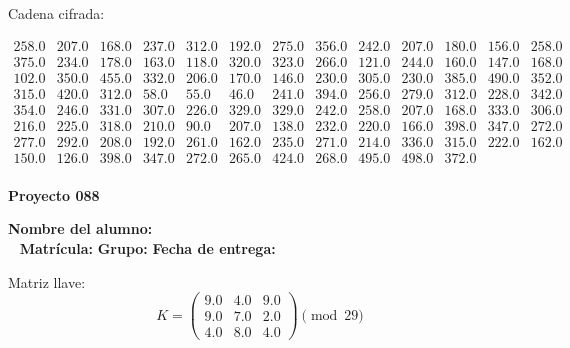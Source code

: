 \documentclass[12pt]{article}
\begin{document}
Cadena cifrada:
\begin{center}
$\begin{array}{lllllllllllll}
258.0 & 207.0 & 168.0 & 237.0 & 312.0 & 192.0 & 275.0 & 356.0 & 242.0 & 207.0 & 180.0 & 156.0 & 258.0\\
375.0 & 234.0 & 178.0 & 163.0 & 118.0 & 320.0 & 323.0 & 266.0 & 121.0 & 244.0 & 160.0 & 147.0 & 168.0\\
102.0 & 350.0 & 455.0 & 332.0 & 206.0 & 170.0 & 146.0 & 230.0 & 305.0 & 230.0 & 385.0 & 490.0 & 352.0\\
315.0 & 420.0 & 312.0 & 58.0 & 55.0 & 46.0 & 241.0 & 394.0 & 256.0 & 279.0 & 312.0 & 228.0 & 342.0\\
354.0 & 246.0 & 331.0 & 307.0 & 226.0 & 329.0 & 329.0 & 242.0 & 258.0 & 207.0 & 168.0 & 333.0 & 306.0\\
216.0 & 225.0 & 318.0 & 210.0 & 90.0 & 207.0 & 138.0 & 232.0 & 220.0 & 166.0 & 398.0 & 347.0 & 272.0\\
277.0 & 292.0 & 208.0 & 192.0 & 261.0 & 162.0 & 235.0 & 271.0 & 214.0 & 336.0 & 315.0 & 222.0 & 162.0\\
150.0 & 126.0 & 398.0 & 347.0 & 272.0 & 265.0 & 424.0 & 268.0 & 495.0 & 498.0 & 372.0\\
\end{array}$
\end{center}

\newpage


\textbf{Proyecto 088}

\textbf{Nombre del alumno:} \underline{\hspace{13cm}}\\\
\vspace{1cm}
\textbf{Matrícula:} \underline{\hspace{4cm}} \hspace{1cm}
\textbf{Grupo:} \underline{\hspace{2cm}}
\textbf{Fecha de entrega:} \underline{\hspace{2cm}}

\medskip

Matriz llave:
\[
K = \begin{pmatrix}
9.0 & 4.0 & 9.0\\
9.0 & 7.0 & 2.0\\
4.0 & 8.0 & 4.0
\end{pmatrix} \pmod{29}
\]
\end{document}
